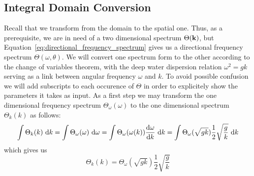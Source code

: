 \subsection{Integral Domain Conversion}
%
Recall that we transform from the  \wavenumber domain to the spatial 
one. Thus, as a prerequisite, we are in need of a two dimensional \wavenumber 
spectrum $\Theta(\mathbf{k})$, but 
Equation~\ref{eq:directional_frequency_spectrum} 
gives us a directional frequency spectrum $\Theta(\omega,\theta)$. We will 
convert one spectrum form to the other according to the change of variables
theorem, with the deep water dispersion relation $\omega^2=gk$
serving as a link between angular frequency $\omega$ and \wavenumber $k$. To 
avoid possible confusion we will add subscripts to each occurence of $\Theta$ 
in order to explicitely show the parameters it takes as input.
As a first step we may transform the one dimensional frequency spectrum 
$\Theta_{\omega}(\omega)$ to the one dimensional \wavenumber 
spectrum $\Theta_k(k)$ as follows:
\begin{equation*}
 \int\Theta_k(k)~\mathrm{d}k = \int\Theta_{\omega}(\omega)~\mathrm{d}\omega\\ = 
\int\Theta_{\omega}(\omega(k))\frac{\mathrm{d}\omega}{\mathrm{d}k}~\mathrm{d}k
= \int\Theta_{\omega}(\sqrt{gk})\frac{1}{2}\sqrt{\frac{g}{k}}~\mathrm{d}k
\end{equation*}
which gives us
\begin{equation}
\label{eq:theta_k}
 \Theta_k(k) = \Theta_{\omega}(\sqrt{gk})\frac{1}{2}\sqrt{\frac{g}{k}}
\end{equation}

